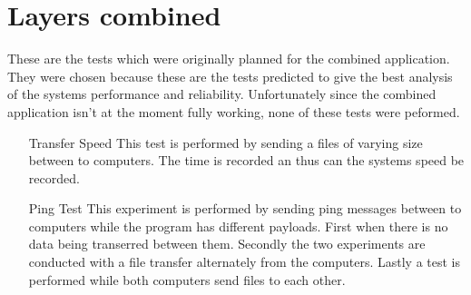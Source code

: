 \section{Layers combined}

These are the tests which were originally planned for the combined application. They were chosen because these are the tests predicted to give the best analysis of the systems performance and reliability. Unfortunately since the combined application isn't at the moment fully working, none of these tests were peformed.

\begin{itemize}
\item[Transfer Speed] This test is performed by sending a files of varying size between to computers. The time is recorded an thus can the systems speed be recorded.
\item[Ping Test] This experiment is performed by sending ping messages between to computers while the program has different payloads. First when there is no data being transerred between them. Secondly the two experiments are conducted with a file transfer alternately from the computers. Lastly a test is performed while both computers send files to each other.  
\end{itemize}
